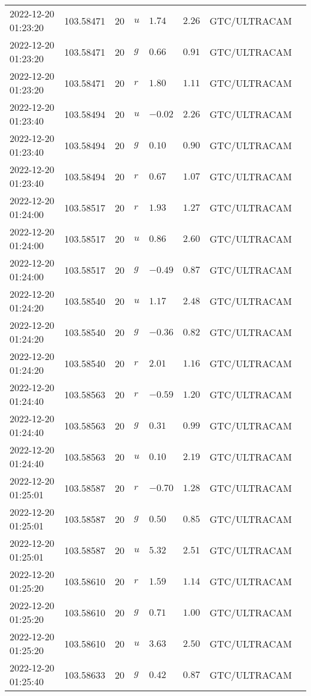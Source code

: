 \documentclass{nature_plusfigure}
\begin{document}
\begin{supplement}
\begin{center}
\begin{longtable}{llllllll}
2022-12-20 01:23:20 & 103.58471 & 20 & $u$ & $1.74$ & $2.26$ & GTC/ULTRACAM &  \\ 
2022-12-20 01:23:20 & 103.58471 & 20 & $g$ & $0.66$ & $0.91$ & GTC/ULTRACAM &  \\ 
2022-12-20 01:23:20 & 103.58471 & 20 & $r$ & $1.80$ & $1.11$ & GTC/ULTRACAM &  \\ 
2022-12-20 01:23:40 & 103.58494 & 20 & $u$ & $-0.02$ & $2.26$ & GTC/ULTRACAM &  \\ 
2022-12-20 01:23:40 & 103.58494 & 20 & $g$ & $0.10$ & $0.90$ & GTC/ULTRACAM &  \\ 
2022-12-20 01:23:40 & 103.58494 & 20 & $r$ & $0.67$ & $1.07$ & GTC/ULTRACAM &  \\ 
2022-12-20 01:24:00 & 103.58517 & 20 & $r$ & $1.93$ & $1.27$ & GTC/ULTRACAM &  \\ 
2022-12-20 01:24:00 & 103.58517 & 20 & $u$ & $0.86$ & $2.60$ & GTC/ULTRACAM &  \\ 
2022-12-20 01:24:00 & 103.58517 & 20 & $g$ & $-0.49$ & $0.87$ & GTC/ULTRACAM &  \\ 
2022-12-20 01:24:20 & 103.58540 & 20 & $u$ & $1.17$ & $2.48$ & GTC/ULTRACAM &  \\ 
2022-12-20 01:24:20 & 103.58540 & 20 & $g$ & $-0.36$ & $0.82$ & GTC/ULTRACAM &  \\ 
2022-12-20 01:24:20 & 103.58540 & 20 & $r$ & $2.01$ & $1.16$ & GTC/ULTRACAM &  \\ 
2022-12-20 01:24:40 & 103.58563 & 20 & $r$ & $-0.59$ & $1.20$ & GTC/ULTRACAM &  \\ 
2022-12-20 01:24:40 & 103.58563 & 20 & $g$ & $0.31$ & $0.99$ & GTC/ULTRACAM &  \\ 
2022-12-20 01:24:40 & 103.58563 & 20 & $u$ & $0.10$ & $2.19$ & GTC/ULTRACAM &  \\ 
2022-12-20 01:25:01 & 103.58587 & 20 & $r$ & $-0.70$ & $1.28$ & GTC/ULTRACAM &  \\ 
2022-12-20 01:25:01 & 103.58587 & 20 & $g$ & $0.50$ & $0.85$ & GTC/ULTRACAM &  \\ 
2022-12-20 01:25:01 & 103.58587 & 20 & $u$ & $5.32$ & $2.51$ & GTC/ULTRACAM &  \\ 
2022-12-20 01:25:20 & 103.58610 & 20 & $r$ & $1.59$ & $1.14$ & GTC/ULTRACAM &  \\ 
2022-12-20 01:25:20 & 103.58610 & 20 & $g$ & $0.71$ & $1.00$ & GTC/ULTRACAM &  \\ 
2022-12-20 01:25:20 & 103.58610 & 20 & $u$ & $3.63$ & $2.50$ & GTC/ULTRACAM &  \\ 
2022-12-20 01:25:40 & 103.58633 & 20 & $g$ & $0.42$ & $0.87$ & GTC/ULTRACAM &  \\ 

\end{longtable}
\end{center}
\end{supplement}
\end{document}
